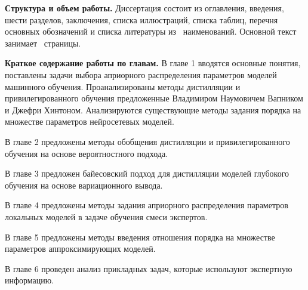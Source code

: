 \vspace{0.5cm}
\textbf{Структура и объем работы.} Диссертация состоит из оглавления, введения, шести разделов, заключения, списка иллюстраций, списка таблиц, перечня основных обозначений и списка литературы из~ наименований. Основной текст занимает~\pageref{LastPage} страницы.

\vspace{0.5cm}
\textbf{Краткое содержание работы по главам.}
В главе 1 вводятся основные понятия, поставлены задачи выбора априорного распределения параметров моделей машинного обучения. Проанализированы методы дистилляции и привилегированного обучения предложенные Владимиром Наумовичем Вапником и Джефри Хинтоном. Анализируются существующие методы задания порядка на множестве параметров нейросетевых моделей.
 
В главе 2 предложены методы обобщения дистилляции и привилегированного обучения на основе вероятностного подхода.

В главе 3 предложен байесовский подход для дистилляции моделей глубокого обучения на основе вариационного вывода.

В главе 4 предложены методы задания априорного распределения параметров локальных моделей в задаче обучения смеси экспертов.

В главе 5 предложены методы введения отношения порядка на множестве параметров аппроксимирующих моделей.

В главе 6 проведен анализ прикладных задач, которые используют экспертную информацию.